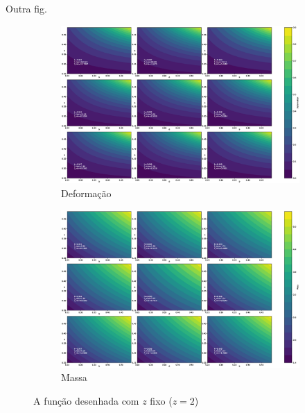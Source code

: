 \documentclass[a4paper,12pt]{article}
\begin{document}
Outra fig.

\begin{figure}[!htbp]
\centering
\begin{subfigure}{.5\textwidth}
  \centering
  \includegraphics[width=.4\linewidth]{deformacao.eps}
  \caption{Deformação}
  \label{fig:sub1}
\end{subfigure}%
\begin{subfigure}{.5\textwidth}
  \centering
  \includegraphics[width=.4\linewidth]{massa.eps}
  \caption{Massa}
  \label{fig:sub2}
\end{subfigure}
\caption{\label{fig:defIm2}A função desenhada com $z$ fixo ($z=2$)}
\end{figure}
\end{document}
